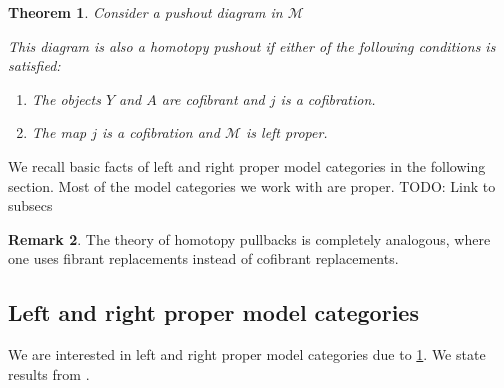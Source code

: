 \documentclass{scrartcl}
\theoremstyle{plain}
\newtheorem{theorem}{Theorem}[section]
\theoremstyle{definition}
\newtheorem{remark}[theorem]{Remark}
\newcommand{\cat}[1]{\mathcal{#1}}
\newcommand{\from}{\leftarrow}
\DeclareMathOperator{\colim}{colim}
\begin{document}
\begin{theorem}\label{thm:homotopy_pushout_sufficient}
    Consider a pushout diagram in $\cat M$
    
    \begin{center}
    \end{center}

    This diagram is also a homotopy pushout if either of the following conditions is satisfied:
    \begin{enumerate}
        \item The objects $Y$ and $A$ are cofibrant and $j$ is a cofibration.
        \item The map $j$ is a cofibration and $\cat M$ is left proper.
    \end{enumerate}
\end{theorem}

We recall basic facts of left and right proper model categories in the following section. Most of the model categories we work with are proper. TODO: Link to subsecs

\begin{remark}
The theory of homotopy pullbacks is completely analogous, where one uses fibrant replacements instead of cofibrant replacements. 
\end{remark}


\subsection{Left and right proper model categories}
We are interested in left and right proper model categories due to \ref{thm:homotopy_pushout_sufficient}. We state results from \cite[15.4]{may2011more}.
\end{document}
